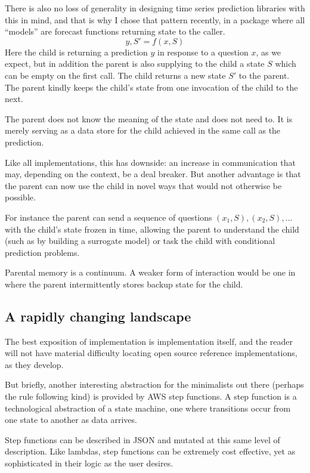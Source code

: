 There is also no loss of generality in designing time series prediction libraries with this in mind, and that is why I chose that pattern recently, in a package where all ``models'' are forecast functions returning state to the caller. 
$$
          y, S' = f(x,S) 
$$
Here the child is returning a prediction $y$ in response to a question $x$, as we expect, but in addition the parent is also supplying to the child a state $S$ which can be empty on the first call. The child returns a new state $S'$ to the parent. The parent kindly keeps the child's state from one invocation of the child to the next. 

The parent does not know the meaning of the state and does not need to. It is merely serving as a data store for the child achieved in the same call as the prediction.

Like all implementations, this has downside: an increase in communication that may, depending on the context, be a deal breaker. But another advantage is that the parent can now use the child in novel ways that would not otherwise be possible. 

For instance the parent can send a sequence of questions $(x_1,S),(x_2,S),\dots$ with the child's state frozen in time, allowing the parent to understand the child (such as by building a surrogate model) or task the child with conditional prediction problems. 

Parental memory is a continuum. A weaker form of interaction would be one in where the parent intermittently stores backup state for the child. 



\subsection{A rapidly changing landscape}


The best exposition of implementation is implementation itself, and the reader will not have material difficulty locating open source reference implementations, as they develop. 

But briefly, another interesting abstraction for the minimalists out there (perhaps the rule following kind) is provided by AWS step functions. A step function is a technological abstraction of a state machine, one where transitions occur from one state to another as data arrives. 


Step functions can be described in JSON and mutated at this same level of description. Like lambdas, step functions can be extremely cost effective, yet as sophisticated in their logic as the user desires. 


